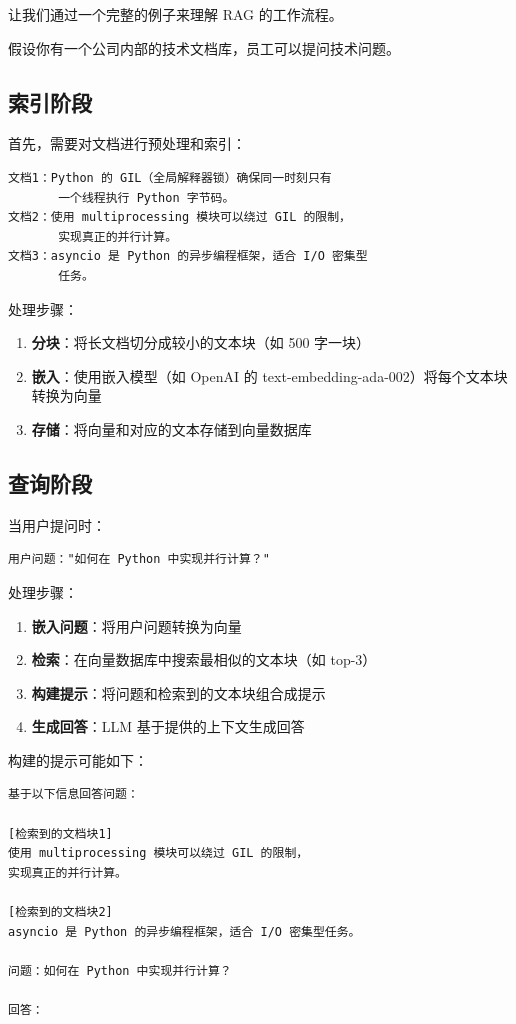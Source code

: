 让我们通过一个完整的例子来理解 RAG 的工作流程。

假设你有一个公司内部的技术文档库，员工可以提问技术问题。

\subsection{索引阶段}

首先，需要对文档进行预处理和索引：

\begin{verbatim}
文档1：Python 的 GIL（全局解释器锁）确保同一时刻只有
       一个线程执行 Python 字节码。
文档2：使用 multiprocessing 模块可以绕过 GIL 的限制，
       实现真正的并行计算。
文档3：asyncio 是 Python 的异步编程框架，适合 I/O 密集型
       任务。
\end{verbatim}

处理步骤：
\begin{enumerate}
    \item \textbf{分块}：将长文档切分成较小的文本块（如 500 字一块）
    \item \textbf{嵌入}：使用嵌入模型（如 OpenAI 的 text-embedding-ada-002）将每个文本块转换为向量
    \item \textbf{存储}：将向量和对应的文本存储到向量数据库
\end{enumerate}

\subsection{查询阶段}

当用户提问时：

\begin{verbatim}
用户问题："如何在 Python 中实现并行计算？"
\end{verbatim}

处理步骤：
\begin{enumerate}
    \item \textbf{嵌入问题}：将用户问题转换为向量
    \item \textbf{检索}：在向量数据库中搜索最相似的文本块（如 top-3）
    \item \textbf{构建提示}：将问题和检索到的文本块组合成提示
    \item \textbf{生成回答}：LLM 基于提供的上下文生成回答
\end{enumerate}

构建的提示可能如下：

\begin{verbatim}
基于以下信息回答问题：

[检索到的文档块1]
使用 multiprocessing 模块可以绕过 GIL 的限制，
实现真正的并行计算。

[检索到的文档块2]
asyncio 是 Python 的异步编程框架，适合 I/O 密集型任务。

问题：如何在 Python 中实现并行计算？

回答：
\end{verbatim}

